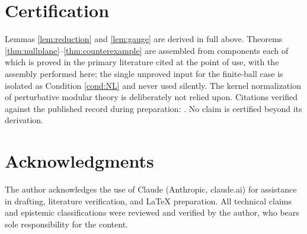 \documentclass[11pt]{article}
\theoremstyle{definition}
\begin{document}
\section*{Certification}

Lemmas \ref{lem:reduction} and \ref{lem:gauge} are derived in full above.
Theorems \ref{thm:nullplane}--\ref{thm:counterexample} are assembled from
components each of which is proved in the primary literature cited at the
point of use, with the assembly performed here; the single unproved input
for the finite-ball case is isolated as Condition \ref{cond:NL} and never
used silently. The kernel normalization of perturbative modular theory is
deliberately not relied upon. Citations verified against the published
record during preparation: \cite{FLPW2016,SarosiUgajin2018,
CasiniTesteTorroba2017,DLP2017}. No claim is certified beyond its
derivation.

\section*{Acknowledgments}
The author acknowledges the use of Claude (Anthropic, claude.ai) for
assistance in drafting, literature verification, and \LaTeX{} preparation.
All technical claims and epistemic classifications were reviewed and
verified by the author, who bears sole responsibility for the content.
\end{document}
